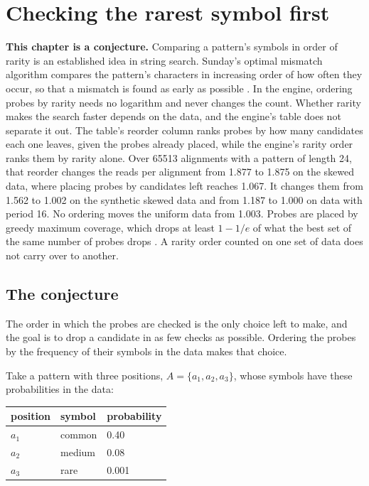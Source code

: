 \chapter{Checking the rarest symbol first}

\noindent\textbf{This chapter is a conjecture.} Comparing a pattern's symbols in order of rarity is an established idea in string search. Sunday's optimal mismatch algorithm compares the pattern's characters in increasing order of how often they occur, so that a mismatch is found as early as possible \cite{src:Sunday-1990}. In the engine, ordering probes by rarity needs no logarithm and never changes the count. Whether rarity makes the search faster depends on the data, and the engine's table does not separate it out. The table's reorder column ranks probes by how many candidates each one leaves, given the probes already placed, while the engine's rarity order ranks them by rarity alone. Over 65513 alignments with a pattern of length 24, that reorder changes the reads per alignment from 1.877 to 1.875 on the skewed data, where placing probes by candidates left reaches 1.067. It changes them from 1.562 to 1.002 on the synthetic skewed data and from 1.187 to 1.000 on data with period 16. No ordering moves the uniform data from 1.003. Probes are placed by greedy maximum coverage, which drops at least \(1 - 1/e\) of what the best set of the same number of probes drops \cite{src:Nemhauser-Wolsey-and-Fisher}. A rarity order counted on one set of data does not carry over to another.

\section{The conjecture}

The order in which the probes are checked is the only choice left to make, and the goal is to drop a candidate in as few checks as possible. Ordering the probes by the frequency of their symbols in the data makes that choice.

Take a pattern with three positions, \(A = \{a_1, a_2, a_3\}\), whose symbols have these probabilities in the data:

\begin{center}
\begin{tabular}{lll}
\toprule
position & symbol & probability \\
\midrule
\(a_1\) & common & 0.40 \\
\(a_2\) & medium & 0.08 \\
\(a_3\) & rare & 0.001 \\
\bottomrule
\end{tabular}
\end{center}

